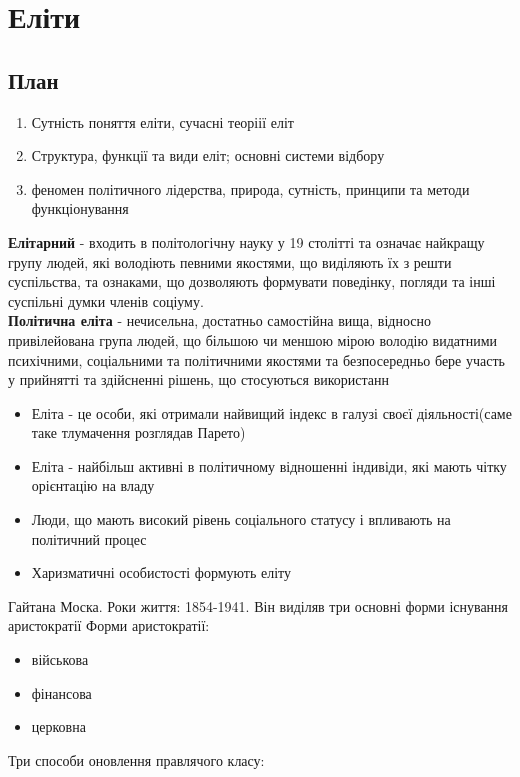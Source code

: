 \section{Еліти}
\subsection{План}
\begin{enumerate}
\item Сутність поняття еліти, сучасні теоріії еліт 
\item Структура, функції та види еліт; основні системи відбору
\item феномен політичного лідерства, природа, сутність, принципи та методи функціонування
\end{enumerate}
\textbf{Елітарний} - входить в політологічну науку у 19 столітті та означає найкращу групу людей, які володіють певними якостями, що виділяють їх з решти суспільства, та ознаками, що дозволяють формувати поведінку, погляди та інші суспільні думки членів соціуму.\\
\textbf{Політична еліта} - нечисельна, достатньо самостійна вища, відносно привілейована група людей, що більшою чи меншою мірою володію видатними психічними, соціальними та політичними якостями та безпосередньо бере участь у прийнятті та здійсненні рішень, що стосуються використанн
\begin{itemize}
\item Еліта - це особи, які отримали найвищий індекс в галузі своєї діяльності(саме таке тлумачення розглядав Парето)
\item Еліта - найбільш активні  в політичному відношенні індивіди, які мають чітку орієнтацію на владу
\item Люди, що мають високий рівень соціального статусу і впливають на політичний процес
\item Харизматичні особистості формують еліту
\end{itemize}
Гайтана Моска. Роки життя: 1854-1941. Він виділяв три основні форми існування аристократії
Форми аристократії: 
\begin{itemize}
\item військова
\item фінансова
\item церковна
\end{itemize}
Три способи оновлення правлячого класу:

